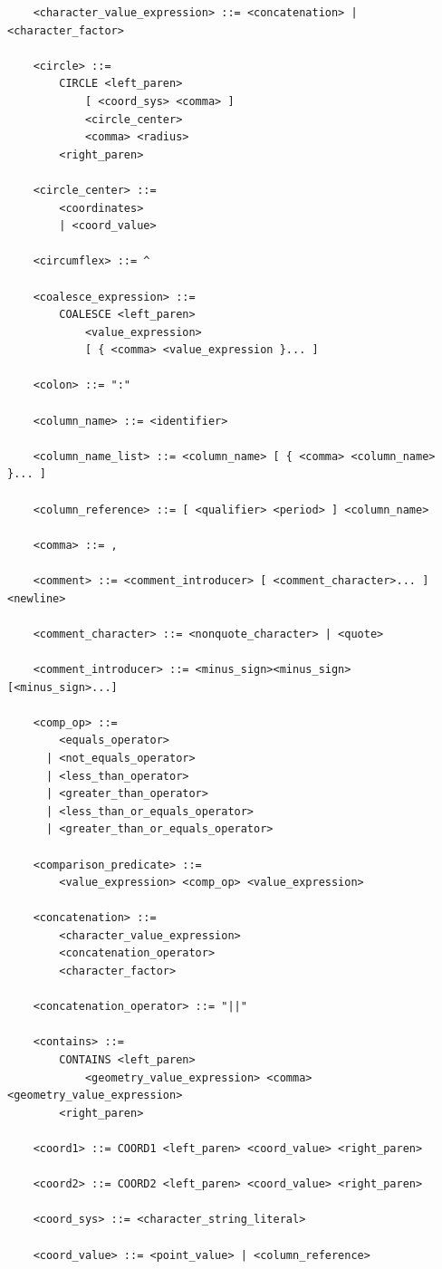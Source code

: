 \documentclass[11pt,a4paper]{ivoa}
\begin{document}
\begin{verbatim}
    <character_value_expression> ::= <concatenation> | <character_factor>

    <circle> ::=
        CIRCLE <left_paren>
            [ <coord_sys> <comma> ]
            <circle_center>
            <comma> <radius>
        <right_paren>
    
    <circle_center> ::=
        <coordinates>
        | <coord_value>

    <circumflex> ::= ^

    <coalesce_expression> ::= 
        COALESCE <left_paren>
            <value_expression>
            [ { <comma> <value_expression }... ]

    <colon> ::= ":"

    <column_name> ::= <identifier>

    <column_name_list> ::= <column_name> [ { <comma> <column_name> }... ]

    <column_reference> ::= [ <qualifier> <period> ] <column_name>

    <comma> ::= ,

    <comment> ::= <comment_introducer> [ <comment_character>... ] <newline>

    <comment_character> ::= <nonquote_character> | <quote>

    <comment_introducer> ::= <minus_sign><minus_sign> [<minus_sign>...]

    <comp_op> ::=
        <equals_operator>
      | <not_equals_operator>
      | <less_than_operator>
      | <greater_than_operator>
      | <less_than_or_equals_operator>
      | <greater_than_or_equals_operator>

    <comparison_predicate> ::=
        <value_expression> <comp_op> <value_expression>

    <concatenation> ::=
        <character_value_expression>
        <concatenation_operator>
        <character_factor>

    <concatenation_operator> ::= "||"

    <contains> ::=
        CONTAINS <left_paren>
            <geometry_value_expression> <comma> <geometry_value_expression>
        <right_paren>

    <coord1> ::= COORD1 <left_paren> <coord_value> <right_paren>

    <coord2> ::= COORD2 <left_paren> <coord_value> <right_paren>

    <coord_sys> ::= <character_string_literal>

    <coord_value> ::= <point_value> | <column_reference>


\end{verbatim}
\end{document}
